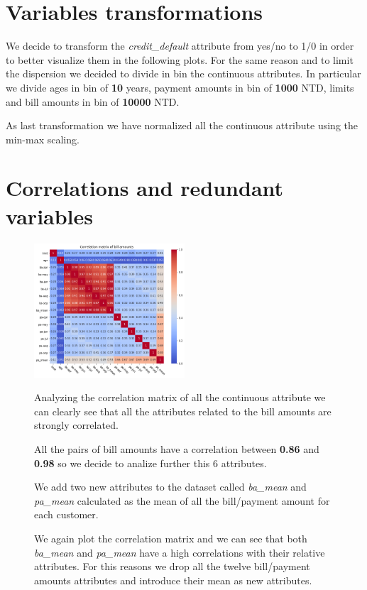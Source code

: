 \section{Variables transformations}

We decide to transform the \textit{credit\_default} attribute from yes/no to 1/0 in order to better visualize them in the following plots. For the same reason and to limit the dispersion we decided to divide in bin the continuous attributes. In particular we divide ages in bin of \textbf{10} years, payment amounts in bin of \textbf{1000} NTD, limits and bill amounts in bin of \textbf{10000} NTD.

As last transformation we have normalized all the continuous attribute using the min-max scaling.

\section{Correlations and redundant variables}

\begin{figure}[h]
  \begin{minipage}[h]{.95\textwidth}
  
    \begin{floatingfigure}[r]{0.50\textwidth}
        \mbox{\includegraphics[width=0.50\textwidth]{img/ch2/correlation_matrix_ba}}
    \end{floatingfigure}

  Analyzing the correlation matrix of all the continuous attribute we can clearly see that all the attributes related to the bill amounts are strongly correlated.

  All the pairs of bill amounts have a correlation between \textbf{0.86} and \textbf{0.98} so we decide to analize further this $6$ attributes.
    
  We add two new attributes to the dataset called \textit{ba\_mean} and \textit{pa\_mean} calculated as the mean of all the bill/payment amount for each customer.
  
  We again plot the correlation matrix and we can see that both \textit{ba\_mean} and \textit{pa\_mean} have a high correlations with their relative attributes. For this reasons we drop all the twelve bill/payment amounts attributes and introduce their mean as new attributes. 
    
  \end{minipage}
\end{figure}
